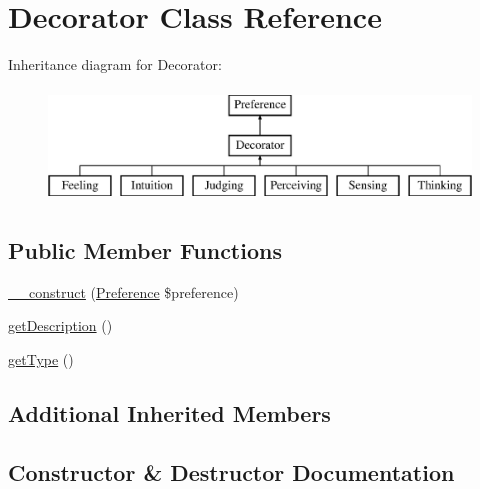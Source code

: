 \hypertarget{class_classes_1_1_preferences_1_1_decorator}{}\section{Decorator Class Reference}
\label{class_classes_1_1_preferences_1_1_decorator}
Inheritance diagram for Decorator\+:\begin{figure}[H]
\begin{center}
\leavevmode
\includegraphics[height=3.000000cm]{class_classes_1_1_preferences_1_1_decorator}
\end{center}
\end{figure}
\subsection*{Public Member Functions}
\begin{DoxyCompactItemize}
\item 
\hyperlink{class_classes_1_1_preferences_1_1_decorator_a3b2b8d2271520af67fdf930580a59b12}{\+\_\+\+\_\+construct} (\hyperlink{class_classes_1_1_preferences_1_1_preference}{Preference} \$preference)
\item 
\hyperlink{class_classes_1_1_preferences_1_1_decorator_a2e7bb35c71bf1824456ceb944cb7a845}{get\+Description} ()
\item 
\hyperlink{class_classes_1_1_preferences_1_1_decorator_a830b5c75df72b32396701bc563fbe3c7}{get\+Type} ()
\end{DoxyCompactItemize}
\subsection*{Additional Inherited Members}


\subsection{Constructor \& Destructor Documentation}
\mbox{\label{class_classes_1_1_preferences_1_1_decorator_a3b2b8d2271520af67fdf930580a59b12}} 

